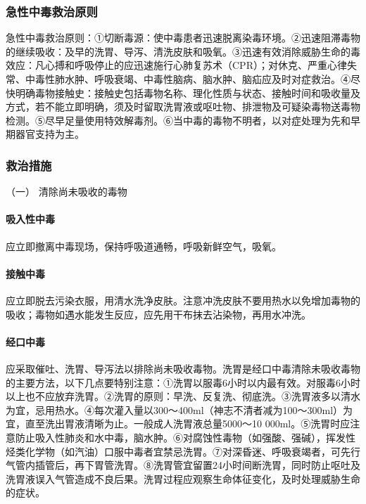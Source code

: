 \subsubsection{急性中毒救治原则}

急性中毒救治原则：①切断毒源：使中毒患者迅速脱离染毒环境。②迅速阻滞毒物的继续吸收：及早的洗胃、导泻、清洗皮肤和吸氧。③迅速有效消除威胁生命的毒效应：凡心搏和呼吸停止的应迅速施行心肺复苏术（CPR）；对休克、严重心律失常、中毒性肺水肿、呼吸衰竭、中毒性脑病、脑水肿、脑疝应及时对症救治。④尽快明确毒物接触史：接触史包括毒物名称、理化性质与状态、接触时间和吸收量及方式，若不能立即明确，须及时留取洗胃液或呕吐物、排泄物及可疑染毒物送毒物检测。⑤尽早足量使用特效解毒剂。⑥当中毒的毒物不明者，以对症处理为先和早期器官支持为主。

\subsubsection{救治措施}

\hypertarget{text00130.htmlux5cux23CHP5-1-3-2-1}{}
（一） 清除尚未吸收的毒物

\paragraph{吸入性中毒}

应立即撤离中毒现场，保持呼吸道通畅，呼吸新鲜空气，吸氧。

\paragraph{接触中毒}

应立即脱去污染衣服，用清水洗净皮肤。注意冲洗皮肤不要用热水以免增加毒物的吸收；毒物如遇水能发生反应，应先用干布抹去沾染物，再用水冲洗。

\paragraph{经口中毒}

应采取催吐、洗胃、导泻法以排除尚未吸收毒物。洗胃是经口中毒清除未吸收毒物的主要方法，以下几点要特别注意：①洗胃以服毒6小时以内最有效。对服毒6小时以上也不应放弃洗胃。②洗胃的原则：早洗、反复洗、彻底洗。③洗胃液多以清水为宜，忌用热水。④每次灌入量以300～400ml（神志不清者减为100～300ml）为宜，直至洗出胃液清晰为止。一般成人洗胃液总量5000～10
000ml。⑤洗胃时应注意防止吸入性肺炎和水中毒，脑水肿。⑥对腐蚀性毒物（如强酸、强碱），挥发性烃类化学物（如汽油）口服中毒者宜禁忌洗胃。⑦对深昏迷、呼吸衰竭者，可先行气管内插管后，再下胃管洗胃。⑧洗胃管宜留置24小时间断洗胃，同时防止呕吐及洗胃液误入气管造成不良后果。洗胃过程应观察生命体征变化，及时处理威胁生命的症状。

